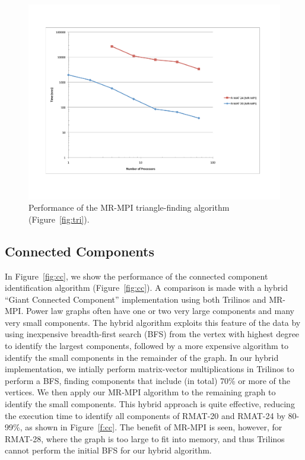 \begin{figure}[htb]
\includegraphics[width=\textwidth]{fig_tri.pdf}
\caption{Performance of the MR-MPI triangle-finding algorithm
(Figure~\ref{fig:tri}).}
\label{f:tri}
\end{figure}

\subsection{Connected Components}

In Figure~\ref{fig:cc}, we show the performance of the connected
component identification algorithm (Figure~\ref{fig:cc}).  A
comparison is made with a hybrid ``Giant Connected Component''
implementation using both Trilinos and MR-MPI.  Power law graphs often
have one or two very large components and many very small components.
The hybrid algorithm exploits this feature of the data by using
inexpensive breadth-first search (BFS) from the vertex with highest
degree to identify the largest components, followed by a more
expensive algorithm to identify the small components in the remainder
of the graph.  In our hybrid implementation, we intially perform
matrix-vector multiplications in Trilinos to perform a BFS, finding
components that include (in total) 70\% or more of the vertices.  We
then apply our MR-MPI algorithm to the remaining graph to identify the
small components.  This hybrid approach is quite effective, reducing
the execution time to identify all components of RMAT-20 and RMAT-24
by 80-99\%, as shown in Figure~\ref{f:cc}.  The benefit of MR-MPI is
seen, however, for RMAT-28, where the graph is too large to fit into
memory, and thus Trilinos cannot perform the initial BFS for our
hybrid algorithm.

